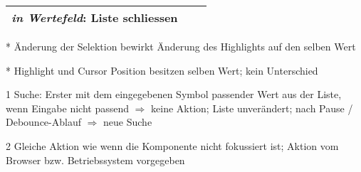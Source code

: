 \begin{table}[!htb]
\begin{adjustbox}{max width=\textwidth}
\begin{threeparttable}
\begin{tabular}{ l || l | l }
{                                                      \emph{in Wertefeld}: Liste schliessen} \\
                \hline
            \end{tabular}
            \begin{tablenotes}
                \scriptsize
                \item[*] Änderung der Selektion bewirkt Änderung des Highlights auf den selben Wert
                \item[*] Highlight und Cursor Position besitzen selben Wert; kein Unterschied
                \item
                \item[1] Suche: Erster mit dem eingegebenen Symbol passender Wert aus der Liste, wenn Eingabe nicht passend $\Rightarrow$ keine Aktion; 
                                Liste unverändert; nach Pause / Debounce-Ablauf $\Rightarrow$ neue Suche
                \item[2] Gleiche Aktion wie wenn die Komponente nicht fokussiert ist; Aktion vom Browser bzw. Betriebssystem vorgegeben
            \end{tablenotes}
        \end{threeparttable}
    \end{adjustbox}
\end{table}
